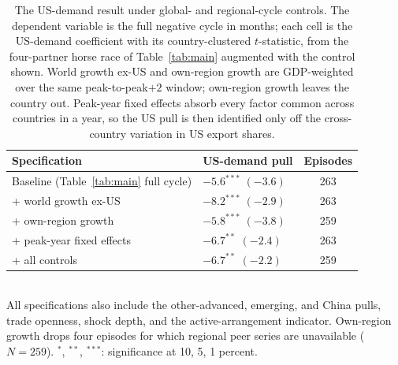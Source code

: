 \begin{table}[H]
\centering\small
\caption{The US-demand result under global- and regional-cycle controls. The dependent variable is the full negative cycle in months; each cell is the US-demand coefficient with its country-clustered $t$-statistic, from the four-partner horse race of Table~\ref{tab:main} augmented with the control shown. World growth ex-US and own-region growth are GDP-weighted over the same peak-to-peak$+2$ window; own-region growth leaves the country out. Peak-year fixed effects absorb every factor common across countries in a year, so the US pull is then identified only off the cross-country variation in US export shares.}
\label{tab:globalctrl}
\begin{tabularx}{\textwidth}{@{}lYc@{}}
\toprule
Specification & US-demand pull & Episodes \\ \midrule
Baseline (Table~\ref{tab:main} full cycle) & $-5.6^{***}$ {\scriptsize$(-3.6)$} & 263 \\
+ world growth ex-US & $-8.2^{***}$ {\scriptsize$(-2.9)$} & 263 \\
+ own-region growth & $-5.8^{***}$ {\scriptsize$(-3.8)$} & 259 \\
+ peak-year fixed effects & $-6.7^{**}$ {\scriptsize$(-2.4)$} & 263 \\
+ all controls & $-6.7^{**}$ {\scriptsize$(-2.2)$} & 259 \\
\bottomrule
\end{tabularx}
\\[2pt]\footnotesize{All specifications also include the other-advanced, emerging, and China pulls, trade openness, shock depth, and the active-arrangement indicator. Own-region growth drops four episodes for which regional peer series are unavailable ($N=259$). $^{*}$, $^{**}$, $^{***}$: significance at 10, 5, 1 percent.}
\end{table}
